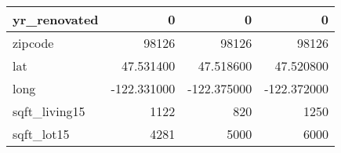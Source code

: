 \begin{table}[H]
\begin{tabular}{|l|r|r|r|}
\hline yr\_renovated & \cellcolor[rgb]{0.9, 0.54, 0.52} 0 & \cellcolor[rgb]{0.9, 0.54, 0.52} 0 & \cellcolor[rgb]{0.9, 0.54, 0.52} 0 \\
\hline zipcode & \cellcolor[rgb]{0.9, 0.54, 0.52} 98126 & \cellcolor[rgb]{0.9, 0.54, 0.52} 98126 & \cellcolor[rgb]{0.9, 0.54, 0.52} 98126 \\
\hline lat & \cellcolor[rgb]{0.9, 0.54, 0.52} 47.531400 & 47.518600 & 47.520800 \\
\hline long & \cellcolor[rgb]{0.9, 0.54, 0.52} -122.331000 & \cellcolor[rgb]{0.9, 0.54, 0.52} -122.375000 & \cellcolor[rgb]{0.9, 0.54, 0.52} -122.372000 \\
\hline sqft\_living15 & \cellcolor[rgb]{0.9, 0.54, 0.52} 1122 & 820 & 1250 \\
\hline sqft\_lot15 & \cellcolor[rgb]{0.9, 0.54, 0.52} 4281 & 5000 & 6000 \\
\hline
\end{tabular}
\end{table}
